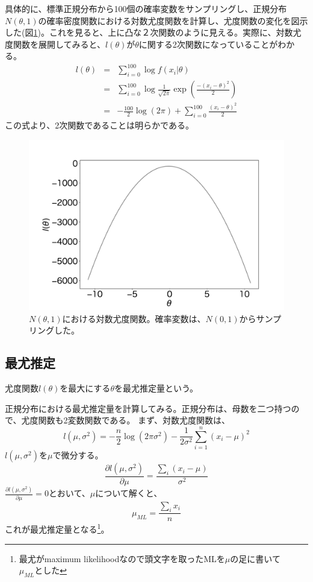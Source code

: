 具体的に、標準正規分布から100個の確率変数をサンプリングし、正規分布$N(\theta,1)$の確率密度関数における対数尤度関数を計算し、尤度関数の変化を図示した(図\ref{fig:loglikelihood_function})。これを見ると、上に凸な２次関数のように見える。実際に、対数尤度関数を展開してみると、$l(\theta)$が$\theta$に関する2次関数になっていることがわかる。
\begin{eqnarray}
    l(\theta) &=& \sum_{i=0}^{100} \log f(x_i|\theta) \\
    &=& \sum_{i=0}^{100} \log \frac{1}{\sqrt{2\pi}}\exp\left( \frac{-(x_i-\theta)^2}{2} \right) \\
    &=&  -\frac{100}{2}\log(2\pi)+\sum_{i=0}^{100}\frac{(x_i-\theta)^2}{2}
\end{eqnarray}
この式より、2次関数であることは明らかである。

\begin{figure}
    \centering
    \includegraphics[width=15cm]{./image/02_/loglikelihood_function.pdf}
    \caption{$N(\theta,1)$における対数尤度関数。確率変数は、$N(0,1)$からサンプリングした。}
    \label{fig:loglikelihood_function}
\end{figure}

\subsection{最尤推定}
\begin{defi}
    尤度関数$l(\theta)$を最大にする$\theta$を最尤推定量という。
\end{defi}
正規分布における最尤推定量を計算してみる。正規分布は、母数を二つ持つので、尤度関数も2変数関数である。
まず、対数尤度関数は、
\begin{equation*}
    l(\mu,\sigma^2) = -\frac{n}{2}\log(2\pi\sigma^2)-\frac{1}{2\sigma^2}\sum_{i=1}^n(x_i-\mu)^2 
\end{equation*}
$l(\mu,\sigma^2)$を$\mu$で微分する。
\begin{equation*}
    \frac{\partial l(\mu,\sigma^2)}{\partial \mu} = \frac{\sum_i(x_i-\mu)}{\sigma^2}
\end{equation*}
$\frac{\partial l(\mu,\sigma^2)}{\partial \mu} = 0$とおいて、$\mu$について解くと、
\begin{equation*}
    \mu_{ML} = \frac{\sum_i x_i}{n}
\end{equation*}
これが最尤推定量となる\footnote{最尤がmaximum likelihoodなので頭文字を取ったMLを$\mu$の足に書いて$\mu_{ML}とした$}。

